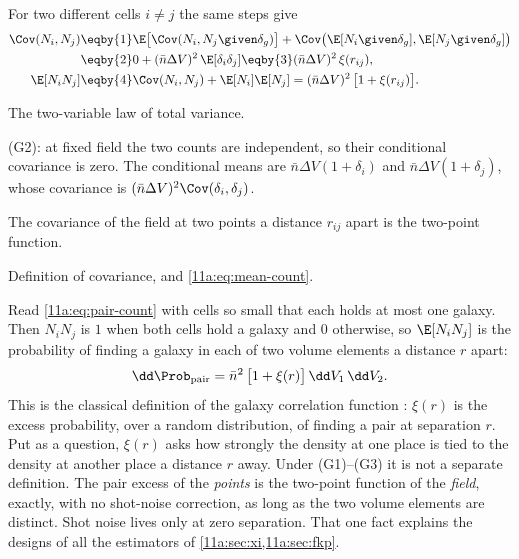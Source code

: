 For two different cells $i\neq j$ the same steps give
\begin{align}
  \Cov(N_i,N_j)
  &\eqby{1} \E\bigl[\Cov(N_i,N_j\given\delta_g)\bigr]
     +\Cov\bigl(\E[N_i\given\delta_g],\E[N_j\given\delta_g]\bigr)\nonumber\\
  &\eqby{2} 0+(\bar n\Delta V)^2\,\E[\delta_i\delta_j]
   \eqby{3} (\bar n\Delta V)^2\,\xi(r_{ij}),\label{11a:eq:cov-count}\\
  \E[N_iN_j]
  &\eqby{4} \Cov(N_i,N_j)+\E[N_i]\E[N_j]
   = (\bar n\Delta V)^2\,\bigl[1+\xi(r_{ij})\bigr]. \label{11a:eq:pair-count}
\end{align}
\begin{explain}
  \item The two-variable law of total variance.
  \item (G2): at fixed field the two counts are independent, so their conditional
        covariance is zero. The conditional means are
        $\bar n\Delta V(1+\delta_i)$ and $\bar n\Delta V(1+\delta_j)$, whose
        covariance is $(\bar n\Delta V)^2\Cov(\delta_i,\delta_j)$.
  \item The covariance of the field at two points a distance $r_{ij}$ apart is the
        two-point function.
  \item Definition of covariance, and \eqref{11a:eq:mean-count}.
\end{explain}
Read \eqref{11a:eq:pair-count} with cells so small that each holds at most one
galaxy. Then $N_iN_j$ is $1$ when both cells hold a galaxy and $0$ otherwise, so
$\E[N_iN_j]$ is the probability of finding a galaxy in each of two volume elements
a distance $r$ apart:
\begin{equation}
  \dd\Prob_{\text{pair}}=\bar n^2\,\bigl[1+\xi(r)\bigr]\,\dd V_1\,\dd V_2 .
  \label{11a:eq:pair-prob}
\end{equation}
This is the classical definition of the galaxy correlation function
\cite{Peebles1980}: $\xi(r)$ is the excess probability, over a random
distribution, of finding a pair at separation $r$. Put as a question, $\xi(r)$ asks how strongly the density at one
place is tied to the density at another place a distance $r$ away. Under
(G1)--(G3) it is not a separate definition. The pair excess of the \emph{points} is the two-point
function of the \emph{field}, exactly, with no shot-noise correction, as long as
the two volume elements are distinct. Shot noise lives only at zero separation.
That one fact explains the designs of all the estimators of
\cref{11a:sec:xi,11a:sec:fkp}.

